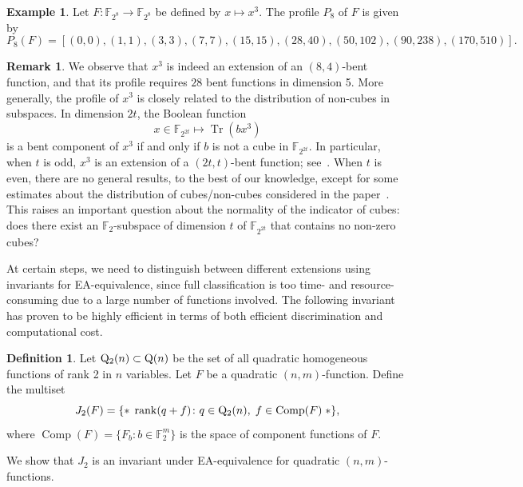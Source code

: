 \documentclass{amsart}[11pt]
\theoremstyle{plain}
\theoremstyle{definition}
\newtheorem{example}[theorem]{Example}
\newtheorem{definition}[theorem]{Definition}
\newtheorem{remark}[theorem]{Remark}
\numberwithin{theorem}{section}
\numberwithin{equation}{section}
\numberwithin{table}{section}
\numberwithin{figure}{section}
\numberwithin{algorithm}{section}
\def\F{\mathbb F}
\def\qfspace(#1){{{\rm Q}(#1)}}
\begin{document}
\begin{example}
    Let $F\colon\F_{2^8}\to\F_{2^8}$ be defined by  $x \mapsto x^3$. The profile $P_8$ of $F$ is given by
    $$P_8(F)=[(0, 0), (1, 1), (3, 3), (7, 7), (15, 15), (28, 40), (50, 102), (90, 238), (170, 510)].$$
\end{example}


\begin{remark}
    We observe that $x^3$ is indeed an extension of an $(8,4)$-bent function, and that its profile requires $28$ bent functions in dimension 5. More generally, the profile of $x^3$ is closely related to the distribution of non-cubes in subspaces. In dimension $2t$, the Boolean function $$x\in\F_{2^{2t}} \mapsto \operatorname{Tr}(b x^3)$$ is a bent component of $x^3$ if and only if $b$ is not a cube in $\F_{2^{2t}}$. In particular, when $t$ is odd, $x^3$ is an extension of a $(2t,t)$-bent function; see~\cite[Section 3]{Carlet11}. When $t$ is even, there are no general results, to the best of our knowledge, except for some estimates about the distribution of cubes/non-cubes considered in the paper~\cite{GologluL20}. This raises an important question about the normality of the indicator of cubes: does there exist an $\F_2$-subspace of dimension $t$ of $\F_{2^{2t}}$ that contains no non-zero cubes?
\end{remark}

At certain steps, we need to distinguish between different extensions using invariants for EA-equivalence, since full classification is too time- and resource-consuming due to a large number of functions involved. The following invariant has proven to be highly efficient in terms of both efficient discrimination and computational cost.

\begin{definition}
     Let ${\rm Q}_2(n)\subset \qfspace(n)$ be the set of all quadratic homogeneous functions of rank 2 in $n$ variables. Let $F$ be a quadratic $(n,m)$-function. Define the multiset
	\begin{equation}
		J_2(F) = \{* \; \operatorname{rank}(q + f) \colon q \in {\rm Q}_2(n), \; f \in \operatorname{Comp}(F) \; *\},
	\end{equation}
	where $\operatorname{Comp}(F) = \{ F_b \colon b \in \mathbb{F}_2^m \}$ is the space of component functions of $F$.
\end{definition}

We show that $J_2$ is an invariant under EA-equivalence for quadratic $(n,m)$-functions.
\end{document}
